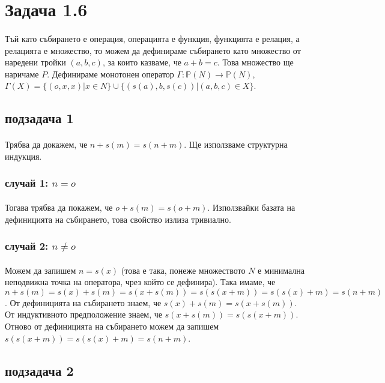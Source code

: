 \documentclass[12pt]{article}
\begin{document}
\section*{Задача 1.6}
\paragraph*{}
Тъй като събирането е операция, операцията е функция, функцията е релация, а релацията е множество, то можем да дефинираме събирането като множество от наредени тройки $(a, b, c)$, за които казваме, че $a+b=c$. Това множество ще наричаме $P$. Дефинираме монотонен оператор $\Gamma : \mathbb{P}(N) \rightarrow \mathbb{P}(N)$, $\Gamma(X) = \{ (o, x, x) | x \in N\} \cup \{ (s(a), b, s(c)) | (a, b, c) \in X \}$.

\subsection*{подзадача 1}
\paragraph*{}
Трябва да докажем, че $n+s(m)=s(n+m)$. Ще използваме структурна индукция.
\subsubsection*{случай 1: $n = o$}
\paragraph*{}
Тогава трябва да покажем, че $o + s(m) = s(o+m)$. Използвайки базата на дефиницията на събирането, това свойство излиза тривиално.
\subsubsection*{случай 2: $n \neq o$}
\paragraph*{}
Можем да запишем $n = s(x)$ (това е така, понеже множеството $N$ е минимална неподвижна точка на оператора, чрез който се дефинира). Така имаме, че $n+s(m) = s(x)+s(m) = s(x+s(m)) = s(s(x+m)) = s(s(x) + m) = s(n+m)$. От дефиницията на събирането знаем, че $s(x)+s(m) = s(x+s(m))$. От индуктивното предположение знаем, че $s(x+s(m)) = s(s(x+m))$. Отново от дефиницията на събирането можем да запишем $s(s(x+m)) = s(s(x)+m) = s(n+m)$.

\subsection*{подзадача 2}
\end{document}
